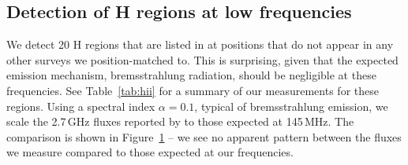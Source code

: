 \documentclass[useAMS,usenatbib]{mn2e}
\begin{document}
\begin{figure}
\label{fig:comparisonscatters}
\end{figure}

\subsection{Detection of {H} regions at low frequencies}
We detect 20 {H} regions that are listed in \cite{Paladini.03} at positions that do not appear in any other surveys we position-matched to. This is surprising, given that the expected emission mechanism, bremsstrahlung radiation, should be negligible at these frequencies. See Table~\ref{tab:hii} for a summary of our measurements for these regions. Using a spectral index $\alpha=0.1$, typical of bremsstrahlung emission, we scale the 2.7\,GHz fluxes reported by \cite{Paladini.03} to those expected at 145\,MHz. The comparison is shown in Figure~\ref{fig:comparisonscatters} -- we see no apparent pattern between the fluxes we measure compared to those expected at our frequencies.
\end{document}
